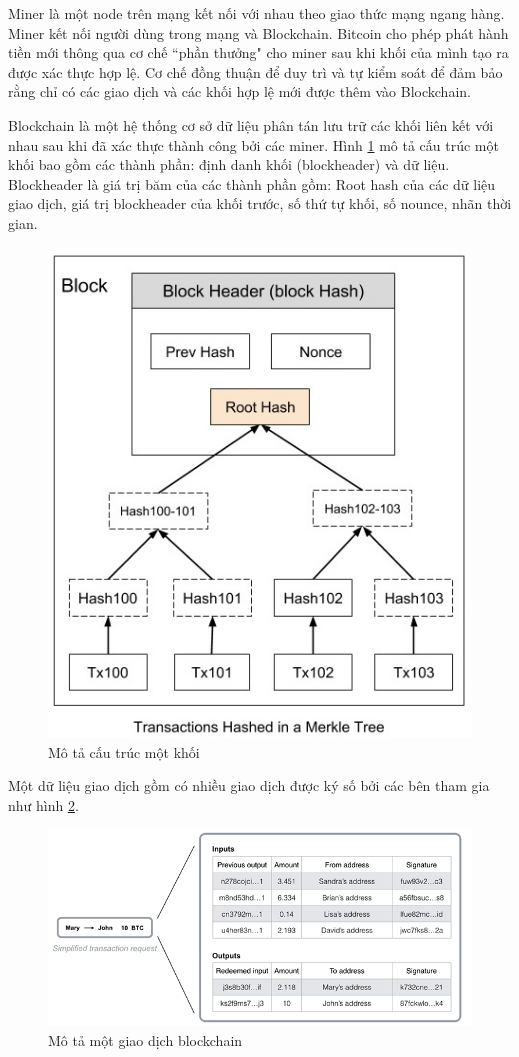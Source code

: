 Miner là một node trên mạng kết nối với nhau theo giao thức mạng ngang hàng.
Miner kết nối người dùng trong mạng và Blockchain.
Bitcoin cho phép phát hành tiền mới thông qua cơ chế ``phần thưởng" cho miner sau khi khối của mình tạo ra được xác thực hợp lệ. Cơ chế đồng thuận để duy trì và tự kiểm soát để đảm bảo rằng chỉ có các giao dịch và các khối hợp lệ mới được thêm vào Blockchain.

Blockchain là một hệ thống cơ sở dữ liệu phân tán lưu trữ các khối liên kết với nhau sau khi đã xác thực thành công bởi các miner. Hình \ref{fig:merkle_bitcoin} mô tả cấu trúc một khối bao gồm các thành phần: định danh khối (blockheader) và dữ liệu.
Blockheader là giá trị băm của các thành phần gồm: Root hash của các dữ liệu giao dịch, giá trị blockheader của khối trước, số thứ tự khối, số nounce, nhãn thời gian.

\begin{figure}[htbp]
\centering
\includegraphics[width=.5\linewidth]{img/merkle_tree.jpg}
\caption{Mô tả cấu trúc một khối}
\label{fig:merkle_bitcoin}
\end{figure}

Một dữ liệu giao dịch gồm có nhiều giao dịch được ký số bởi các bên tham gia như hình \ref{fig:trans_bitcoin}.

\begin{figure}[htbp]
\centering
\includegraphics[width=.9\linewidth]{img/trans_bitcoin.png}
\caption{Mô tả một giao dịch blockchain}
\label{fig:trans_bitcoin}
\end{figure}

